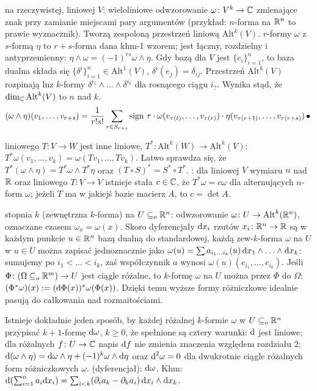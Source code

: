   na rzeczywistej, liniowej $V$: wieloliniowe odwzorowanie $\omega \colon V^k \to \mathbb{C}$ zmienające znak przy zamianie miejscami pary argumentów (przykład: $n$-forma na $\mathbb{R}^n$ to prawie wyznacznik).
Tworzą zespoloną przestrzeń liniową $\textrm{Alt}^k(V)$.
 $r$-formy $\omega$ z $s$-formą $\eta$ to $r+s$-forma dana khm-1 wzorem; jest łączny, rozdzielny i antyprzemienny: $\eta \wedge \omega = (-1)^{rs} \omega \wedge \eta$.
Gdy bazą dla $V$ jest $\{e_i\}_{i=1}^n$, to baza dualna składa się $\{\delta^i\}_{i=1}^n \in \textrm{Alt}^1(V)$, $\delta^i(e_j) = \delta_{ij}$.
Przestrzeń $\textrm{Alt}^k(V)$ rozpinają lnz $k$-formy $\delta^{i_1} \wedge \ldots \wedge \delta^{i_k}$ dla rosnącego ciągu $i_?$.
Wynika stąd, że $\dim_{\mathbb{C}} \textrm{Alt}^k(V)$ to $n$ nad $k$.
\[
	(\omega \wedge \eta)(v_1, \dots, v_{r+s}) = \frac{1}{r!s!} \sum_{r \in S_{r+s}} {\textrm{sign } \tau} \cdot \omega(v_{\tau(t)}, \dots, v_{\tau(r)}) \cdot \eta(v_{\tau(r+1)}, \dots, v_{\tau(r+s)}) \, \bullet \,
\]

 liniowego $T \colon V \to W$ jest inne liniowe, $T^* \colon \textrm{Alt}^k(W) \to  \textrm{Alt}^k(V)$: $T^*\omega(v_1, \dots, v_k) = \omega(Tv_1, \dots, Tv_k)$.
Łatwo sprawdza się, że $T^*(\omega \wedge \eta) = T^* \omega \wedge T^* \eta$ oraz $(T \circ S)^* = S^* \circ T^*$.
: dla liniowej $V$ wymiaru $n$ nad $\mathbb{R}$ oraz liniowego $T \colon V \to V$ istnieje stała $c \in \mathbb{C}$, że $T^* \omega = c \omega$ dla alternujących $n$-form $\omega$; jeżeli $T$ ma w jakiejś bazie macierz $A$, to $c = \det A$.

  stopnia $k$ (zewnętrzna $k$-forma) na $U \subseteq_o \mathbb{R}^n$: odwzorowanie $\omega \colon U \to \textrm{Alt}^k(\mathbb{R}^n)$, oznaczane czasem $\omega_x = \omega(x)$. 
Skoro dyferencjały $\textrm{d} x_i$ rzutów $x_i \colon \mathbb{R}^n \to \mathbb{R}$ są w każdym punkcie $u \in \mathbb{R}^n$ bazą dualną do standardowej, każdą zew-$k$-forma $\omega$ na $U$ w $u \in U$ można zapisać jednoznacznie jako $\omega(u) = \sum a_{i_1\ldots i_k} (u) \,\textrm{d} x_1 \wedge \ldots \wedge \textrm{d} x_k$: sumujemy po $i_1 < \ldots < i_k$, zaś współczynnik $a$ wynosi $\omega(u)(e_{i_1}, \ldots, e_{i_k})$.
Jeśli $\Phi \colon (\Omega \subseteq_o \mathbb{R}^m) \to U$ jest ciągle różalne, to $k$-formę $\omega$ na $U$ można  przez $\Phi$ do $\Omega$: $(\Phi^* \omega)(x) := (\textrm{d} \Phi(x))^* \omega (\Phi(x))$.
Dzięki temu wyższe formy różniczkowe idealnie pasują do całkowania nad rozmaitościami.

Istnieje dokładnie jeden sposób, by każdej różalnej $k$-formie $\omega$ w $U \subseteq_o \mathbb{R}^n$ przypisać $k+1$-formę $\textrm{d} \omega$, $k \ge 0$, że spełnione są cztery warunki: $\textrm{d}$ jest liniowe; dla różalnych $f \colon U \to \mathbb{C}$ napis $\textrm{d} f$ nie zmienia znaczenia względem rozdziału 2; $\textrm{d} (\omega \wedge \eta) = \textrm{d} \omega \wedge \eta + (-1)^k \omega \wedge \textrm{d} \eta$ oraz $\textrm{d}^2 \omega = 0$ dla dwukrotnie ciągle różalnych form różniczkowych $\omega$.
 (dyferencjał): $\textrm{d} \omega$.
Khm: $\textrm{d}(\sum_{i=1}^n a_i \textrm{d} x_i) = \sum_{i < k} (\partial_i a_k - \partial_k a_i) \, \textrm{d} x_i \wedge \textrm{d} x_k$.

